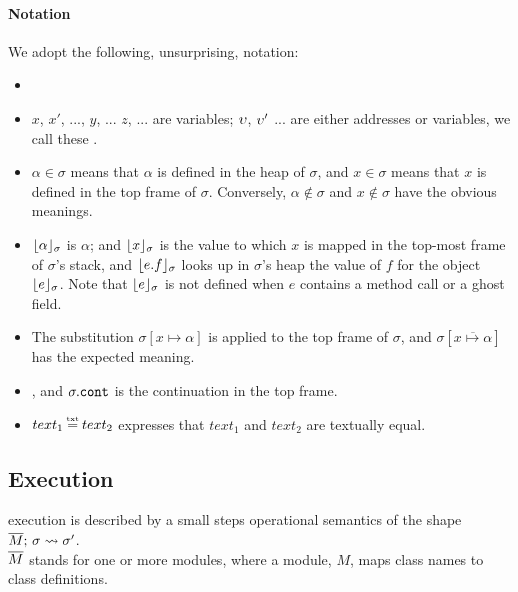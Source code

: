 \paragraph{Notation} We adopt the following, unsurprising, notation:
\begin{itemize}
\item
{}
\item
$x$, $x'$,  ..., $y$, ... $z$, ... are variables;  $\upsilon$, $\upsilon'$ ... are either addresses or variables, we call these \emph{\atoms}.
\item
$\alpha \in \sigma$ means that $\alpha$ is defined in the heap of $\sigma$, and $x\in \sigma$ means that $x$ is defined in the top frame of $\sigma$.
Conversely,  $\alpha\notin\sigma$ and $x\notin\sigma$ %
 have the obvious meanings.
\item
$\lfloor \alpha \rfloor_{\sigma}$  is $\alpha$; and $\lfloor x \rfloor_{\sigma}$  is the value to which  $x$  is mapped in the top-most frame of $\sigma$'s stack, 
and $\lfloor e.f \rfloor_{\sigma}$ looks up in $\sigma$'s heap the value of $f$ for the object  $\lfloor e \rfloor_{\sigma}$.
Note that $\lfloor e \rfloor_{\sigma}$ is not defined when $e$ contains a method call or a ghost field.
\item The substitution  $\sigma[x \mapsto \alpha]$ is applied to the top frame of $\sigma$, and $\sigma[\overline{x \mapsto \alpha}]$ %
has the expected meaning.
\item
{}, and $\sigma.{\texttt{cont}}$ is the continuation in the top frame.
\item
$text_1 \txteq text_2$ expresses that $text_1$ and $text_2$ are textually equal.
\end{itemize}

  

  
\subsection{\LangOO Execution}
\label{sect:execution}

 \LangOO execution is described by a small steps operational semantics of the shape $\overline{M};\, \sigma \leadsto {\sigma'}$.\\
  $\overline{M}$ stands for one or more modules, where a
  module,  $M$, maps class names to class definitions. 
   
